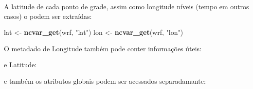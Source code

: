\documentclass[]{book}
\newenvironment{Shaded}{\begin{snugshade}}{\end{snugshade}}
\newcommand{\KeywordTok}[1]{\textcolor[rgb]{0.13,0.29,0.53}{\textbf{#1}}}
\newcommand{\StringTok}[1]{\textcolor[rgb]{0.31,0.60,0.02}{#1}}
\newcommand{\CommentTok}[1]{\textcolor[rgb]{0.56,0.35,0.01}{\textit{#1}}}
\newcommand{\NormalTok}[1]{#1}
\theoremstyle{definition}
\theoremstyle{definition}
\theoremstyle{definition}
\theoremstyle{remark}
\begin{document}
A latitude de cada ponto de grade, assim como longitude níveis (tempo em
outros casos) o podem ser extraídas:

\begin{Shaded}
\begin{Highlighting}[]
\NormalTok{lat  <-}\StringTok{ }\KeywordTok{ncvar_get}\NormalTok{(wrf, }\StringTok{"lat"}\NormalTok{)}
\NormalTok{lon  <-}\StringTok{ }\KeywordTok{ncvar_get}\NormalTok{(wrf, }\StringTok{"lon"}\NormalTok{)}
\end{Highlighting}
\end{Shaded}

O metadado de Longitude também pode conter informações úteis:

\begin{Shaded}
\end{Shaded}

e Latitude:

\begin{Shaded}
\end{Shaded}

e também os atributos globais podem ser acessados separadamante:
\end{document}
